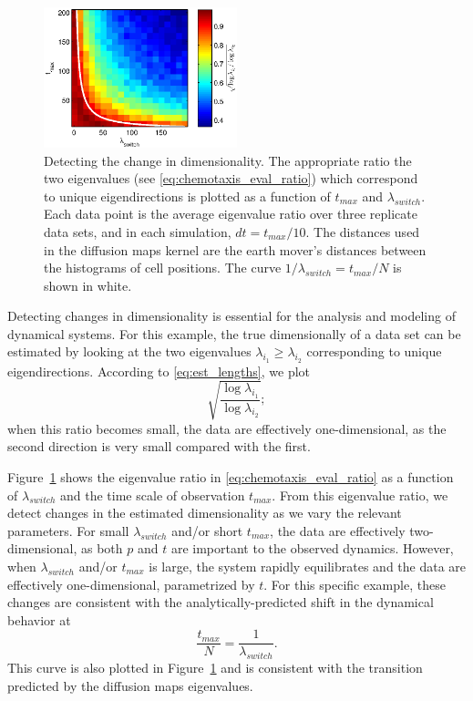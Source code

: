 \begin{figure}[t]
%
\centering
\includegraphics[width=0.5\textwidth]{tmax_lambda_transition}
%
\caption[Detecting changes in dimensionality of chemotaxis simulation data]{Detecting the change in dimensionality. The appropriate ratio the two eigenvalues (see \eqref{eq:chemotaxis_eval_ratio}) which correspond to unique eigendirections is plotted as a function of $t_{max}$ and $\lambda_{switch}$. Each data point is the average eigenvalue ratio over three replicate data sets, and in each simulation, $dt=t_{max}/10$. The distances used in the diffusion maps kernel are the earth mover's distances between the histograms of cell positions. The curve $1/\lambda_{switch} = t_{max}/N$ is shown in white. }
%
\label{fig:chemotaxis_compare_timescales_evals}
%
\end{figure}

Detecting changes in dimensionality is essential for the analysis and modeling of dynamical systems.
%
For this example, the true dimensionally of a data set can be estimated by looking at the two eigenvalues $\lambda_{i_1} \ge \lambda_{i_2}$ corresponding to unique eigendirections.
%
According to \eqref{eq:est_lengths}, we plot
\begin{equation}\label{eq:chemotaxis_eval_ratio}
 \sqrt{\frac{\log \lambda_{i_1}}{\log \lambda_{i_2}}} ;
\end{equation}
when this ratio becomes small, the data are effectively one-dimensional, as the second direction is very small compared with the first.

Figure~\ref{fig:chemotaxis_compare_timescales_evals} shows the eigenvalue ratio in \eqref{eq:chemotaxis_eval_ratio} as a function of $\lambda_{switch}$ and the time scale of observation $t_{max}$.
%
From this eigenvalue ratio, we detect changes in the estimated dimensionality as we vary the relevant parameters.
%
For small $\lambda_{switch}$ and/or short $t_{max}$, the data are effectively two-dimensional, as both $p$ and $t$ are important to the observed dynamics.
%
However, when $\lambda_{switch}$ and/or $t_{max}$ is large, the system rapidly equilibrates and the data are effectively one-dimensional, parametrized by $t$.
%
For this specific example, these changes are consistent with the analytically-predicted shift in the dynamical behavior at
\begin{equation}
\frac{t_{max}}{N} = \frac{1}{\lambda_{switch}}.
\end{equation}
%
This curve is also plotted in Figure~\ref{fig:chemotaxis_compare_timescales_evals} and is consistent with the transition predicted by the diffusion maps eigenvalues.

